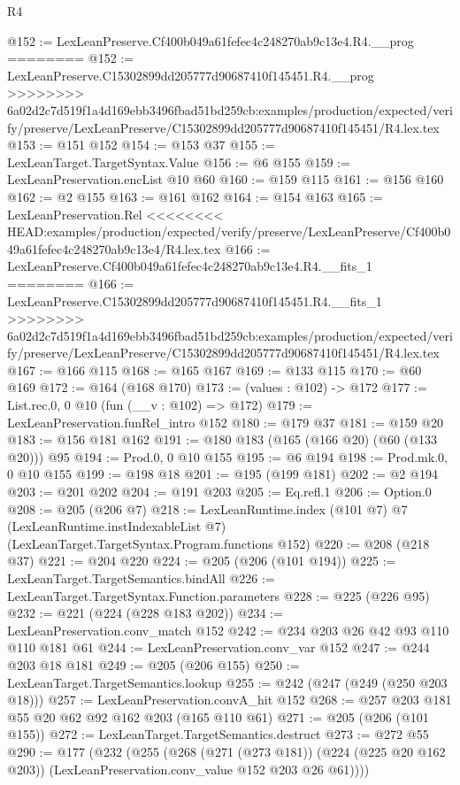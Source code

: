 \begin{lexlean}{R4}
\begin{coremodule}
{{{{{{{{@152 := LexLeanPreserve.Cf400b049a61fefec4c248270ab9c13e4.R4.__prog
========
@152 := LexLeanPreserve.C15302899dd205777d90687410f145451.R4.__prog
>>>>>>>> 6a02d2c7d519f1a4d169ebb3496fbad51bd259cb:examples/production/expected/verify/preserve/LexLeanPreserve/C15302899dd205777d90687410f145451/R4.lex.tex
@153 := @151 @152
@154 := @153 @37
@155 := LexLeanTarget.TargetSyntax.Value
@156 := @6 @155
@159 := LexLeanPreservation.encList @10 @60
@160 := @159 @115
@161 := @156 @160
@162 := @2 @155
@163 := @161 @162
@164 := @154 @163
@165 := LexLeanPreservation.Rel
<<<<<<<< HEAD:examples/production/expected/verify/preserve/LexLeanPreserve/Cf400b049a61fefec4c248270ab9c13e4/R4.lex.tex
@166 := LexLeanPreserve.Cf400b049a61fefec4c248270ab9c13e4.R4.__fits_1
========
@166 := LexLeanPreserve.C15302899dd205777d90687410f145451.R4.__fits_1
>>>>>>>> 6a02d2c7d519f1a4d169ebb3496fbad51bd259cb:examples/production/expected/verify/preserve/LexLeanPreserve/C15302899dd205777d90687410f145451/R4.lex.tex
@167 := @166 @115
@168 := @165 @167
@169 := @133 @115
@170 := @60 @169
@172 := @164 (@168 @170)
@173 := (values : @102) -> @172
@177 := List.rec.{0, 0} @10 (fun (__v : @102) => @172)
@179 := LexLeanPreservation.funRel_intro @152
@180 := @179 @37
@181 := @159 @20
@183 := @156 @181 @162
@191 := @180 @183 (@165 (@166 @20) (@60 (@133 @20))) @95
@194 := Prod.{0, 0} @10 @155
@195 := @6 @194
@198 := Prod.mk.{0, 0} @10 @155
@199 := @198 @18
@201 := @195 (@199 @181)
@202 := @2 @194
@203 := @201 @202
@204 := @191 @203
@205 := Eq.refl.{1}
@206 := Option.{0}
@208 := @205 (@206 @7)
@218 := LexLeanRuntime.index
    (@101 @7)
    @7
    (LexLeanRuntime.instIndexableList @7)
    (LexLeanTarget.TargetSyntax.Program.functions @152)
@220 := @208 (@218 @37)
@221 := @204 @220
@224 := @205 (@206 (@101 @194))
@225 := LexLeanTarget.TargetSemantics.bindAll
@226 := LexLeanTarget.TargetSyntax.Function.parameters
@228 := @225 (@226 @95)
@232 := @221 (@224 (@228 @183 @202))
@234 := LexLeanPreservation.conv_match @152
@242 := @234 @203 @26 @42 @93 @110 @110 @181 @61
@244 := LexLeanPreservation.conv_var @152
@247 := @244 @203 @18 @181
@249 := @205 (@206 @155)
@250 := LexLeanTarget.TargetSemantics.lookup
@255 := @242 (@247 (@249 (@250 @203 @18)))
@257 := LexLeanPreservation.convA_hit @152
@268 := @257 @203 @181 @55 @20 @62 @92 @162 @203 (@165 @110 @61)
@271 := @205 (@206 (@101 @155))
@272 := LexLeanTarget.TargetSemantics.destruct
@273 := @272 @55
@290 := @177
    (@232
      (@255
        (@268
          (@271 (@273 @181))
          (@224 (@225 @20 @162 @203))
          (LexLeanPreservation.conv_value @152 @203 @26 @61))))
}}}}}}}}
\end{coremodule}
\end{lexlean}
